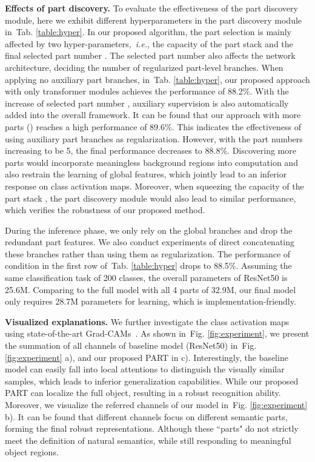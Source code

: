 \documentclass[journal]{IEEEtran}
\def\ie{{\em i.e.}}
\newcommand{\figref}[1]{Fig. \ref{#1}}
\newcommand{\tabref}[1]{Tab. \ref{#1}}
\begin{document}
\textbf{Effects of part discovery.} To evaluate the effectiveness of the part discovery module, here we exhibit different hyperparameters in the part discovery module in~\tabref{table:hyper}. In our proposed algorithm, the part selection is mainly affected by two hyper-parameters,~\ie, the capacity of the part stack
 and the final selected part number . The selected part number also affects the network architecture, deciding the number of regularized part-level branches. When applying no auxiliary part branches, in~\tabref{table:hyper}, our proposed approach with only transformer modules achieves the performance of 88.2\%. With the increase of selected part number , auxiliary supervision is also automatically added into the overall framework. It can be found that our approach with more parts () reaches a high performance of 89.6\%. This indicates the effectiveness of using auxiliary part branches as regularization. However, with the part numbers  increasing to be 5, the final performance decreases to 88.8\%. Discovering more parts would incorporate meaningless background regions into computation and also restrain the learning of global features, which jointly lead to an inferior response on class activation maps.
Moreover, when squeezing the capacity of the part stack , the part discovery module would also lead to similar performance, which verifies the robustness of our proposed method.


During the inference phase, we only rely on the global branches and drop the redundant part features. We also conduct experiments of direct concatenating these branches rather than using them as regularization. The performance of condition  in the first row of~\tabref{table:hyper} drops to 88.5\%.
Assuming the same classification task of 200 classes, the overall parameters of ResNet50 is 25.6M. Comparing to the full model with all 4 parts of 32.9M, our final model only requires 28.7M parameters for learning, which is implementation-friendly.


\textbf{Visualized explanations.} We further investigate the class activation maps using state-of-the-art Grad-CAMs~\cite{selvaraju2017grad}. As shown in~\figref{fig:experiment}, we present the summation of all channels of baseline model (ResNet50) in~\figref{fig:experiment} a), and our proposed PART in c). Interestingly, the baseline model can easily fall into local attentions to distinguish the visually similar samples, which leads to inferior generalization capabilities. While our proposed PART can localize the full object, resulting in a robust recognition ability. Moreover, we visualize the referred channels of our model in~\figref{fig:experiment} b). It can be found that different channels focus on different semantic parts, forming the final robust representations. Although these ``parts" do not strictly meet the definition of natural semantics, while still responding to meaningful object regions.
\end{document}

